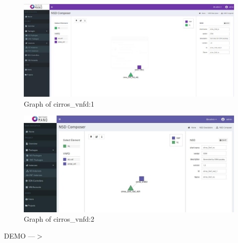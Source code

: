 \begin{frame}
\begin{figure}
	\centering
	\includegraphics[width=1\linewidth]{images/secondnsd2}
	\\Graph of cirros\_vnfd:1
	\label{fig:secondnsd2}
\end{figure}
\end{frame}

\begin{frame}
\begin{figure}
	\centering
	\includegraphics[width=1\linewidth]{images/secondnsd}
	\\Graph of cirros\_vnfd:2
	\label{fig:secondnsd}
\end{figure}
\end{frame}

\begin{frame}

\Huge{\centerline{DEMO ---$ > $}}

\end{frame}



